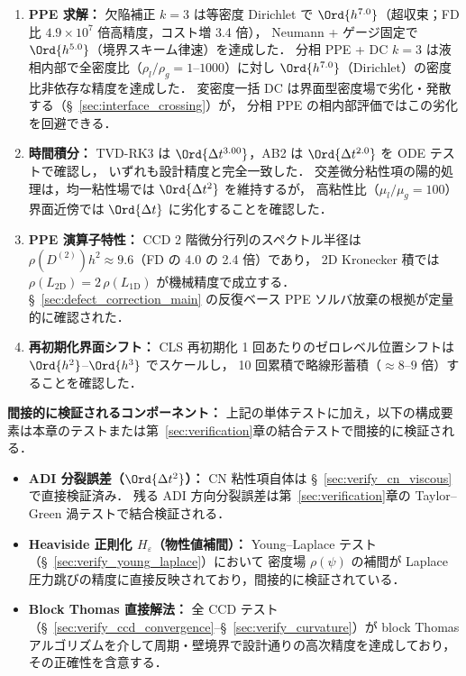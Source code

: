\begin{enumerate}
        2D 最高解像度は丸め・補間誤差床の影響を受ける．
  \item \textbf{PPE 求解：}
        欠陥補正 $k{=}3$ は等密度 Dirichlet で $\Ord{h^{7.0}}$（超収束；FD 比 $4.9 \times 10^7$ 倍高精度，コスト増 3.4 倍），
        Neumann + ゲージ固定で $\Ord{h^{5.0}}$（境界スキーム律速）を達成した．
        分相 PPE + DC $k{=}3$ は液相内部で全密度比（$\rho_l/\rho_g = 1$--$1000$）に対し
        $\Ord{h^{7.0}}$（Dirichlet）の密度比非依存な精度を達成した．
        変密度一括 DC は界面型密度場で劣化・発散する（§~\ref{sec:interface_crossing}）が，
        分相 PPE の相内部評価ではこの劣化を回避できる．
  \item \textbf{時間積分：}
        TVD-RK3 は $\Ord{\Delta t^{3.00}}$，AB2 は $\Ord{\Delta t^{2.0}}$ を ODE テストで確認し，
        いずれも設計精度と完全一致した．
        交差微分粘性項の陽的処理は，均一粘性場では $\Ord{\Delta t^2}$ を維持するが，
        高粘性比（$\mu_l/\mu_g = 100$）界面近傍では $\Ord{\Delta t}$ に劣化することを確認した．
  \item \textbf{PPE 演算子特性：}
        CCD 2 階微分行列のスペクトル半径は $\rho(D^{(2)}) h^2 \approx 9.6$（FD の $4.0$ の 2.4 倍）であり，
        2D Kronecker 積では $\rho(L_{\mathrm{2D}}) = 2\,\rho(L_{\mathrm{1D}})$ が機械精度で成立する．
        §~\ref{sec:defect_correction_main} の反復ベース PPE ソルバ放棄の根拠が定量的に確認された．
  \item \textbf{再初期化界面シフト：}
        CLS 再初期化 1 回あたりのゼロレベル位置シフトは $\Ord{h^2}$--$\Ord{h^3}$ でスケールし，
        10 回累積で略線形蓄積（${\approx}8$--$9$ 倍）することを確認した．
\end{enumerate}

\noindent\textbf{間接的に検証されるコンポーネント：}
上記の単体テストに加え，以下の構成要素は本章のテストまたは第~\ref{sec:verification}章の結合テストで間接的に検証される．
\begin{itemize}[noitemsep]
  \item \textbf{ADI 分裂誤差（$\Ord{\Delta t^2}$）：}
        CN 粘性項自体は §~\ref{sec:verify_cn_viscous} で直接検証済み．
        残る ADI 方向分裂誤差は第~\ref{sec:verification}章の Taylor--Green 渦テストで結合検証される．
  \item \textbf{Heaviside 正則化 $H_\varepsilon$（物性値補間）：}
        Young--Laplace テスト（§~\ref{sec:verify_young_laplace}）において
        密度場 $\rho(\psi)$ の補間が Laplace 圧力跳びの精度に直接反映されており，間接的に検証されている．
  \item \textbf{Block Thomas 直接解法：}
        全 CCD テスト（§~\ref{sec:verify_ccd_convergence}--§~\ref{sec:verify_curvature}）が
        block Thomas アルゴリズムを介して周期・壁境界で設計通りの高次精度を達成しており，
        その正確性を含意する．
\end{itemize}

